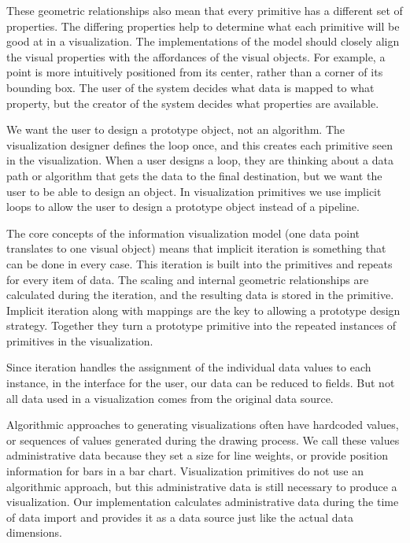 These geometric relationships also mean that every primitive has a different set of properties.
The differing properties help to determine what each primitive will be good at in a visualization.
The implementations of the model should closely align the visual properties with the affordances of the visual objects.
For example, a point is more intuitively positioned from its center, rather than a corner of its bounding box.
The user of the system decides what data is mapped to what property, but the creator of the system decides what properties are available.

\label{iteration}

We want the user to design a prototype object, not an algorithm.
The visualization designer defines the loop once, and this creates each primitive seen in the visualization.
When a user designs a loop, they are thinking about a data path or algorithm that gets the data to the final destination, but we want the user to be able to design an object.
In visualization primitives we use implicit loops to allow the user to design a prototype object instead of a pipeline.

The core concepts of the information visualization model (one data point translates to one visual object) means that implicit iteration is something that can be done in every case.
This iteration is built into the primitives and repeats for every item of data.
The scaling and internal geometric relationships are calculated during the iteration, and the resulting data is stored in the primitive.
Implicit iteration along with mappings are the key to allowing a prototype design strategy.
Together they turn a prototype primitive into the repeated instances of primitives in the visualization.

\label{data}

Since iteration handles the assignment of the individual data values to each instance, in the interface for the user, our data can be reduced to fields.
But not all data used in a visualization comes from the original data source.

Algorithmic approaches to generating visualizations often have hardcoded values, or sequences of values generated during the drawing process.
We call these values administrative data because they set a size for line weights, or provide position information for bars in a bar chart.
Visualization primitives do not use an algorithmic approach, but this administrative data is still necessary to produce a visualization.
Our implementation calculates administrative data during the time of data import and provides it as a data source just like the actual data dimensions.

